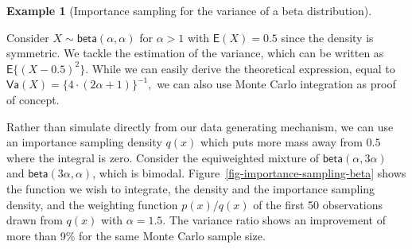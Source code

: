 \documentclass[
  11pt,
  letterpaper,
]{scrbook}
\theoremstyle{definition}
\newtheorem{example}{Example}[chapter]
\theoremstyle{plain}
\theoremstyle{plain}
\theoremstyle{plain}
\theoremstyle{definition}
\theoremstyle{definition}
\theoremstyle{plain}
\theoremstyle{plain}
\theoremstyle{remark}
\begin{document}
\begin{example}[Importance sampling for the variance of a beta
distribution]\protect\hypertarget{exm-is-beta-variance}{}\label{exm-is-beta-variance}

Consider \(X \sim \mathsf{beta}(\alpha, \alpha)\) for \(\alpha > 1\)
with \(\mathsf{E}(X)=0.5\) since the density is symmetric. We tackle the
estimation of the variance, which can be written as
\(\mathsf{E}\{(X - 0.5)^2\}.\) While we can easily derive the
theoretical expression, equal to
\(\mathsf{Va}(X) = \{4 \cdot (2\alpha+1)\}^{-1},\) we can also use Monte
Carlo integration as proof of concept.

Rather than simulate directly from our data generating mechanism, we can
use an importance sampling density \(q(x)\) which puts more mass away
from \(0.5\) where the integral is zero. Consider the equiweighted
mixture of \(\mathsf{beta}(\alpha, 3\alpha)\) and
\(\mathsf{beta}(3\alpha, \alpha)\), which is bimodal.
Figure~\ref{fig-importance-sampling-beta} shows the function we wish to
integrate, the density and the importance sampling density, and the
weighting function \(p(x)/q(x)\) of the first 50 observations drawn from
\(q(x)\) with \(\alpha=1.5.\) The variance ratio shows an improvement of
more than 9\% for the same Monte Carlo sample size.


\end{example}
\end{document}
